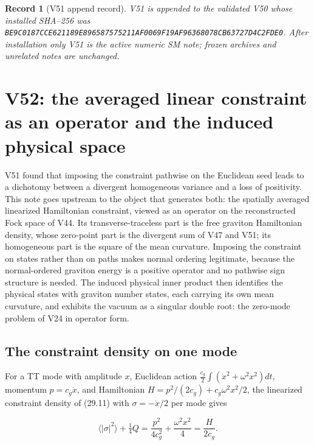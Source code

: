 \documentclass[11pt]{article}
\newtheorem{record}[theorem]{Record}
\theoremstyle{remark}
\begin{document}
\begin{record}[V51 append record]
\label{rec:v19v51}
V51 is appended to the validated V50 whose installed SHA--256 was
\texttt{BE9C0187CCE621189E896587575211AF0069F19AF96368078CB63727D4C2FDE0}.
After installation only V51 is the active numeric SM note; frozen
archives and unrelated notes are unchanged.
\end{record}


\section{V52: the averaged linear constraint as an operator and the induced physical space}
\label{sec:v19v52}

V51 found that imposing the constraint pathwise on the Euclidean seed
leads to a dichotomy between a divergent homogeneous variance and a
loss of positivity.  This note goes upstream to the object that
generates both: the spatially averaged linearized Hamiltonian
constraint, viewed as an operator on the reconstructed Fock space of
V44.  Its transverse-traceless part is the free graviton Hamiltonian
density, whose zero-point part is the divergent sum of V47 and V51; its
homogeneous part is the square of the mean curvature.  Imposing the
constraint on states rather than on paths makes normal ordering
legitimate, because the normal-ordered graviton energy is a positive
operator and no pathwise sign structure is needed.  The induced
physical inner product then identifies the physical states with
graviton number states, each carrying its own mean curvature, and
exhibits the vacuum as a singular double root: the zero-mode problem
of V24 in operator form.

\subsection{The constraint density on one mode}

For a TT mode with amplitude \(x\), Euclidean action
\(\tfrac{c_g}2\int(\dot x^2+\omega^2x^2)dt\), momentum \(p=c_g\dot x\),
and Hamiltonian \(H=p^2/(2c_g)+c_g\omega^2x^2/2\), the linearized
constraint density of (29.11) with \(\sigma=-\dot x/2\) per mode gives

\[
 \langle|\sigma|^2\rangle+\tfrac14Q
 =\frac{p^2}{4c_g^2}+\frac{\omega^2x^2}4
 =\frac{H}{2c_g}.                                                     \tag{55.1}
\]
\end{document}
